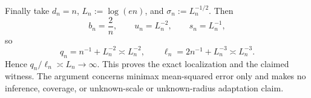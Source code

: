 Finally take \(d_n=n\), \(L_n:=\log(en)\), and \(\sigma_n:=L_n^{-1/2}\).  Then
\[
 b_n=\frac2n,\qquad u_n=L_n^{-2},\qquad s_n=L_n^{-1},
\]
so
\[
 q_n=n^{-1}+L_n^{-2}\asymp L_n^{-2},
 \qquad
 \ell_n=2n^{-1}+L_n^{-3}\asymp L_n^{-3}.
\]
Hence \(q_n/\ell_n\asymp L_n\to\infty\).  This proves the exact localization and the claimed witness.  The argument concerns minimax mean-squared error only and makes no inference, coverage, or unknown-scale or unknown-radius adaptation claim.